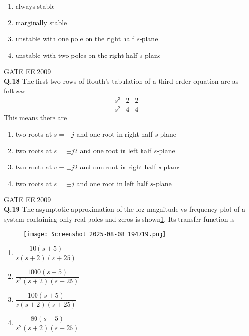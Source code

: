 \documentclass[12pt]{article}
\begin{document}
\begin{enumerate}
    \item always stable
    \item marginally stable
    \item unstable with one pole on the right half $s$-plane
    \item unstable with two poles on the right half $s$-plane
\end{enumerate}

\vspace{1cm}

\hspace{10pt}
GATE EE 2009\\


\noindent\textbf{Q.18} The first two rows of Routh's tabulation of a third order equation are as follows:
\[
\begin{array}{ccc}
s^3 & 2 & 2 \\
s^2 & 4 & 4
\end{array}
\]
This means there are
\begin{enumerate}
    \item  two roots at $s = \pm j$ and one root in right half $s$-plane
    \item two roots at $s = \pm j2$ and one root in left half $s$-plane
      \item two roots at $s = \pm j2$ and one root in right half $s$-plane
     \item  two roots at $s = \pm j$ and one root in left half $s$-plane
\end{enumerate}

\vspace{0.5cm}
\hspace{10pt}
GATE EE 2009\\
\noindent\textbf{Q.19} The asymptotic approximation of the log-magnitude vs frequency plot of a system containing only real poles and zeros is shown\ref{fig:5}. Its transfer function is
\begin{figure}[h]
    \centering
    \texttt{[image: Screenshot 2025-08-08 194719.png]}
    \label{fig:5}
\end{figure}

\begin{enumerate}
     \item  $\dfrac{10(s+5)}{s (s+2) (s+25)}$
     \item  $\dfrac{1000 (s+5)}{s^{2} (s+2)(s+25)}$
 \item  $\dfrac{100 (s+5)}{s (s+2) (s+25)}$
     \item $\dfrac{80 (s+5)}{s^{2} (s+2) (s+25)}$
\end{enumerate}
\end{document}
